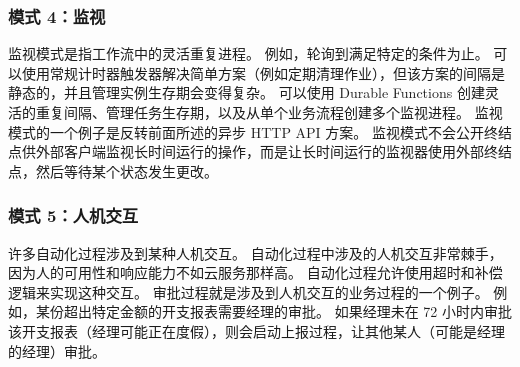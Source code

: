 \documentclass[11pt]{article}
\begin{document}
\subsubsection{模式 4：监视}
监视模式是指工作流中的灵活重复进程。 例如，轮询到满足特定的条件为止。 可以使用常规计时器触发器解决简单方案（例如定期清理作业），但该方案的间隔是静态的，并且管理实例生存期会变得复杂。 可以使用 Durable Functions 创建灵活的重复间隔、管理任务生存期，以及从单个业务流程创建多个监视进程。
监视模式的一个例子是反转前面所述的异步 HTTP API 方案。 监视模式不会公开终结点供外部客户端监视长时间运行的操作，而是让长时间运行的监视器使用外部终结点，然后等待某个状态发生更改。

\subsubsection{模式 5：人机交互}
许多自动化过程涉及到某种人机交互。 自动化过程中涉及的人机交互非常棘手，因为人的可用性和响应能力不如云服务那样高。 自动化过程允许使用超时和补偿逻辑来实现这种交互。
审批过程就是涉及到人机交互的业务过程的一个例子。 例如，某份超出特定金额的开支报表需要经理的审批。 如果经理未在 72 小时内审批该开支报表（经理可能正在度假），则会启动上报过程，让其他某人（可能是经理的经理）审批。
\end{document}
